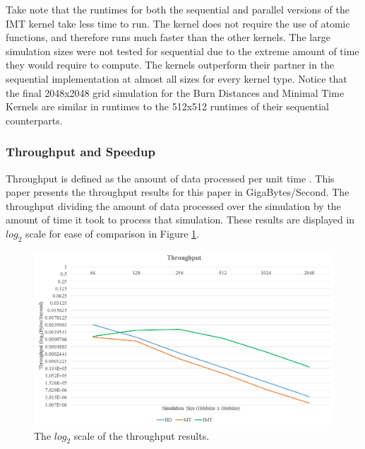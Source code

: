 Take note that the runtimes for both the sequential and parallel versions of the IMT kernel take less time to run. The kernel does not require the use of atomic functions, and therefore runs much faster than the other kernels. The large simulation sizes were not tested for sequential due to the extreme amount of time they would require to compute. The kernels outperform their partner in the sequential implementation at almost all sizes for every kernel type. Notice that the final 2048x2048 grid simulation for the Burn Distances and Minimal Time Kernels are similar in runtimes to the 512x512 runtimes of their sequential counterparts. 

\subsubsection{Throughput and Speedup}
Throughput is defined as the amount of data processed per unit time \cite{cuda}. This paper presents the throughput results for this paper in GigaBytes/Second. The throughput dividing the amount of data processed over the simulation by the amount of time it took to process that simulation. These results are displayed in $log_2$ scale for ease of comparison in Figure \ref{fig:throughput}.
\begin{figure}[H]
\centering
  \includegraphics[width=\textwidth]{figures/results/throughput.png}
  \caption{The $log_2$ scale of the throughput results.}
  \label{fig:throughput}
\end{figure} 

